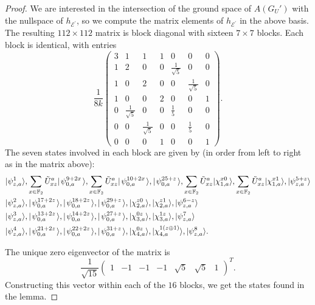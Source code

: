 \documentclass[../thesis-main/thesis-main]{subfiles}
\begin{document}
\begin{proof}
We are interested in the intersection of the ground space of $A(G_U')$ with the nullspace of $h_{\mathcal{E}^{\prime}}$, so we compute the matrix elements of $h_{\mathcal{E}^{\prime}}$ in the above basis. The resulting $112\times 112$ matrix is block diagonal with sixteen $7\times 7$ blocks. Each block is identical, with entries
\begin{equation} \frac{1}{8k}
\begin{pmatrix}
  3 & 1 & 1 &1 & 0 & 0 & 0\\ 
  1 & 2 & 0 & 0 & \frac{1}{\sqrt{5}} & 0 & 0\\
  1 & 0 & 2 & 0 & 0 & \frac{1}{\sqrt{5}} & 0\\
  1 & 0 & 0 & 2 & 0 & 0 & 1\\
  0 & \frac{1}{\sqrt{5}} & 0 & 0 & \frac{1}{5} & 0 & 0\\
  0 & 0 & \frac{1}{\sqrt{5}} & 0 & 0 & \frac{1}{5} & 0\\
  0 & 0 & 0 & 1 & 0 & 0 & 1
\end{pmatrix}.\label{eq:three_by_three_blocks}
\end{equation}
The seven states involved in each block are given by (in order from left to right as in the matrix above):
\begin{align}
 & |\psi_{z,a}^{1}\rangle,  \sum_{x\in\mathbb{F}_2} \tilde{U}^a_{xz}  |\mspace{2mu} \psi_{0,a}^{9 + 2 x} \mspace{2mu} \rangle, \sum_{x\in\mathbb{F}_2} \tilde{U}^a_{xz}  |\mspace{2mu} \psi_{0,a}^{10 + 2 x} \mspace{2mu} \rangle,
     |\mspace{2mu} \psi_{0,a}^{25+z} \mspace{2mu} \rangle,\sum_{x\in\mathbb{F}_2}\tilde{U}^a_{xz}|\chi_{1,a}^{x0}\rangle,\sum_{x\in\mathbb{F}_2}\tilde{U}^a_{xz}|\chi_{1,a}^{x1}\rangle,|\psi_{z,a}^{5+z}\rangle\\
 & |\psi_{z,a}^{2}\rangle,|\mspace{2mu} \psi_{0,a}^{17+2z} \mspace{2mu} \rangle, |\mspace{2mu} \psi_{0,a}^{18+2z} \mspace{2mu} \rangle, |\mspace{2mu} \psi_{0,a}^{29+z} \mspace{2mu} \rangle,|\chi_{2,a}^{z0}\rangle,|\chi_{2,a}^{z1}\rangle,|\psi_{z,a}^{6-z}\rangle\\
 & |\psi_{z,a}^{3}\rangle,|\mspace{2mu} \psi_{0,a}^{13+2z} \mspace{2mu} \rangle, |\mspace{2mu} \psi_{0,a}^{14+2z} \mspace{2mu} \rangle, |\mspace{2mu} \psi_{0,a}^{27+z} \mspace{2mu} \rangle,|\chi_{3,a}^{0z}\rangle,|\chi_{3,a}^{1z}\rangle,|\psi_{z,a}^{7}\rangle\\
 & |\psi_{z,a}^{4}\rangle,|\mspace{2mu} \psi_{0,a}^{21+2z} \mspace{2mu} \rangle, |\mspace{2mu} \psi_{0,a}^{22+2z} \mspace{2mu} \rangle, |\mspace{2mu} \psi_{0,a}^{31+z} \mspace{2mu} \rangle,|\chi_{4,a}^{0z}\rangle,|\chi_{4,a}^{1\left(z\oplus1\right)}\rangle,|\psi_{z,a}^{8}\rangle.
\end{align}

The unique zero eigenvector of the matrix  is 
\begin{equation}
  \frac{1}{\sqrt{15}} \begin{pmatrix}
  1 & -1 & -1 & -1 & \sqrt{5} & \sqrt{5} & 1
  \end{pmatrix}^T.
\end{equation}
Constructing this vector within each of the $16$ blocks, we get the states found in the lemma. 
\end{proof}
\end{document}
